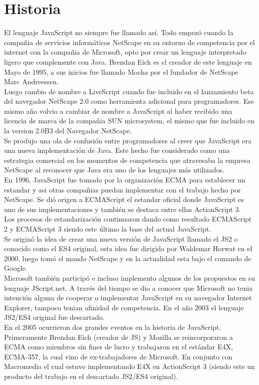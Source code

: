 \documentclass[11pt]{article} %
\begin{document}
\section{Historia}
El lenguaje JavaScript no siempre fue llamado así. Todo empezó cuando la compañia de servicios informáticos NetScape en su entorno de competencia por el internet con la compañia de Microsoft, opto por crear un lenguaje interpretado ligero que complemente con Java. Brendan Eich es el creador de este lenguaje en Mayo de 1995, a sus inicios fue llamado Mocha por el fundador de NetScape Marc Andreessen.\\
Luego cambio de nombre a LiveScript cuando fue incluido en el lanzamiento beta del navegador NetScape 2.0 como herramienta adicional para programadores. Ese mismo año volvio a cambiar de nombre a JavaScript al haber recibido una licencia de marca de la compañia SUN microsystem, el mismo que fue incluido en la version 2.0B3 del Navegador NetScape.\\
Se produjo una ola de confusión entre programadores al creer que JavaScript era una nueva implementación de Java. Este hecho fue considerado como una estrategia comercial en los momentos de competencia que atravesaba la empresa NetScape al reconocer que Java era uno de los lenguajes más utilizados.\\
En 1996, JavaScript fue tomado por la organización ECMA para establecer un estandar y asi otras compañias puedan implementar con el trabajo hecho por NetScape. Se dió origen a ECMAScript el estandar oficial donde JavaScript es uno de sus implementaciones y también se destaca entre ellas ActionScript 3.\\
Los procesos de estandarización continuaron dando como resultado ECMAScript 2 y ECMAScript 3 siendo este último la base del actual JavaScript.\\
Se originó la idea de crear una nueva versión de JavaScript llamado el JS2 o conocido como el ES4 original, esta idea fue dirigida por Waldemar Horwat en el 2000, luego tomó el mando NetScape y en la actualidad esta bajo el comando de Google.\\
Microsoft también participó e incluso implemento algunos de los propuestos en su lenguaje JScript.net. A través del tiempo se dio a conocer que Microsoft no tenia intención alguna de cooperar o implementar JavaScript en su navegador Internet Explorer, tampoco tenian afinidad de competencia. En el año 2003 el lenguaje JS2/ES4 original fue descartado.\\
En el 2005 ocurrieron dos grandes eventos en la historia de JavaScript. Primeramente Brendan Eich (creador de JS) y Mozilla se reincorporaron a ECMA como miembros sin fines de lucro y trabajaron en el estándar E4X, ECMA-357, la cual vino de ex-trabajadores de Microsoft. En conjunto con Macromedia el cual estuvo implementando E4X en ActionScript 3 (siendo este un producto del trabajo en el descartado JS2/ES4 original).\\
\end{document}
